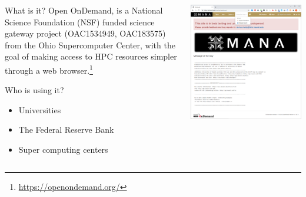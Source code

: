 \begin{frame}
\begin{columns}
\begin{column}{0.50\textwidth}
	\begin{block}{ What is it?}
	Open OnDemand, is a National Science Foundation (NSF) funded science gateway project (OAC1534949, OAC183575) from the Ohio Supercomputer Center, with the goal of making access to HPC resources simpler through a web browser.\footnote[1,frame]{\tiny \href{https://openondemand.org/}{https://openondemand.org/}}
	\end{block}
	\begin{block}{ Who is using it?}
	  \begin{minipage}[t][0.20\textheight][t]{\linewidth} 		
	\begin{itemize}
	\item Universities
	\item The Federal Reserve Bank
	\item Super computing centers
	\end{itemize}
	\end{minipage}
	\end{block}
	\end{column}
	\begin{column}{0.50\textwidth} %
	\vspace{-2.5em}
	\begin{center}
  \includegraphics[scale=0.15]{05.png}
	\end{center}
	\end{column}
	\end{columns}
\end{frame}


